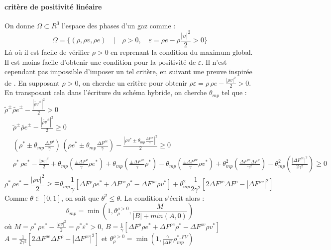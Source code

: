 \paragraph{critère de positivité linéaire}
On donne $\Omega \subset R^3$ l'espace des phases d'un gaz comme :  
\begin{equation}
    \Omega = \{(\rho,\rho v,\rho e)\quad | \quad \rho >0, \quad \varepsilon= \rho e - \rho \frac{|v|^2}{2} >0\}
\end{equation}
Là où il est facile de vérifier $\rho >0$ en reprenant la condition du maximum global. Il est moins facile d'obtenir une condition pour la positivité de $\varepsilon$. 
Il n'est cependant pas impossible d'imposer un tel critère, en suivant une preuve inspirée de  \cite{VILAR2025}  \cite{Rueda-Ramírez2024} \cite{Kuzmin2020}. En supposant $\rho >0$, on cherche un critère pour obtenir $\rho \varepsilon =  \rho \,\rho e - \frac{|\rho v|^2}{2} >0$.\\
En transposant cela dans l'écriture du schéma hybride, on cherche $\theta_{mp}$ tel que : $\widetilde{\rho}^{\pm} \widetilde{\rho e}^{\pm} - \frac{|\widetilde{\rho v}^{\pm}|^2}{2} >0$
\begin{align*}
    &\widetilde{\rho}^{\pm} \widetilde{\rho e}^{\pm} - \frac{|\widetilde{\rho v}^{\pm}|^2}{2}  \geq 0 \\
    &\left( \rho^*   \pm \theta_{mp}\frac{\Delta F^{\rho  } }{\gamma} \right) \, \left(\rho e^* \pm \theta_{mp}\frac{\Delta F^{\rho e} }{\gamma} \right) - 
     \frac{|\rho v^* \pm \theta_{mp}\frac{\Delta F^{\rho v} }{\gamma}|^2}{2}  \geq 0 \\
    &\rho^* \, \rho e^* - \frac{|\rho v|^2}{2}
    +\theta_{mp}\left(\frac{\pm\Delta F^{\rho  } }{\gamma}\rho e^*  \right)
    +\theta_{mp}\left(\frac{\pm\Delta F^{\rho e} }{\gamma}\rho^*    \right)
    -\theta_{mp}\left(\frac{\pm\Delta F^{\rho v} }{\gamma}\rho v^*    \right)
    +\theta_{mp}^2\left(\frac{\Delta F^{\rho e}\Delta F^{\rho}}{\gamma^2} \right)
    -\theta_{mp}^2\left(\frac{|\Delta F^{\rho v}|^2}{2\gamma^2} \right) \geq 0
\end{align*}
\begin{equation}\label{positivity_eq}
    \rho^* \, \rho e^* - \frac{|\rho v|^2}{2} \geq 
    \mp \theta_{mp} \frac{1}{\gamma}   \left[\Delta F^{\rho} \rho e^* + \Delta F^{\rho e} \rho^* - \Delta F^{\rho v} \rho v^* \right]
    + \theta_{mp}^2 \frac{1}{2\gamma^2}\left[2\Delta F^{\rho e}\Delta F^{\rho}- |\Delta F^{\rho v}|^2\right]
\end{equation}
Comme $\theta \in [0,1]$, on sait que $\theta^2 \leq \theta$. La condition s'écrit alors : 
\begin{equation}
\theta_{mp} = \min \left(1, \theta_\rho^{\rho>0}, \frac{M}{|B|+ min(A,0) } \right) 
\end{equation}
où $M = \rho^* \, \rho e^* - \frac{|\rho v|^2}{2} = \rho^* \varepsilon^*>0 $, 
$B= \frac{1}{\gamma}   \left[\Delta F^{\rho} \rho e^* + \Delta F^{\rho e} \rho^* - \Delta F^{\rho v} \rho v^* \right]$
$A = \frac{1}{2\gamma^2}\left[2\Delta F^{\rho e}\Delta F^{\rho}- |\Delta F^{\rho v}|^2\right]$ 
et $\theta_\rho^{\rho>0} = \min \left(1, \frac{\gamma}{|\Delta F|}  {\rho}_{mp}^{*,FV} \right)$ \\

